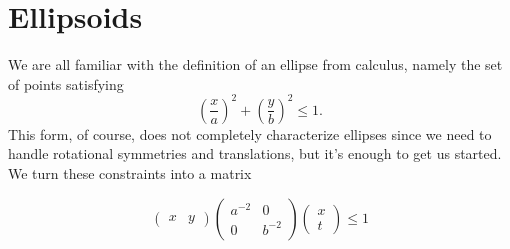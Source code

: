 
\section{Ellipsoids}
We are all familiar with the definition of an ellipse from
calculus, namely the set of points satisfying
%
\[\left(\frac xa\right)^2 + \left(\frac yb\right)^2 \leq 1.\]
%
This form, of course, does not completely characterize ellipses since we need to
handle rotational symmetries and translations, but it's enough to get us
started. We turn these constraints into a matrix

\[\left(\begin{matrix}x&y\end{matrix}\right)
  \left(\begin{matrix}a^{-2} &0\\0&b^{-2}\end{matrix}\right)
    \left(\begin{matrix}x\\t\end{matrix}\right)\leq 1
\]
